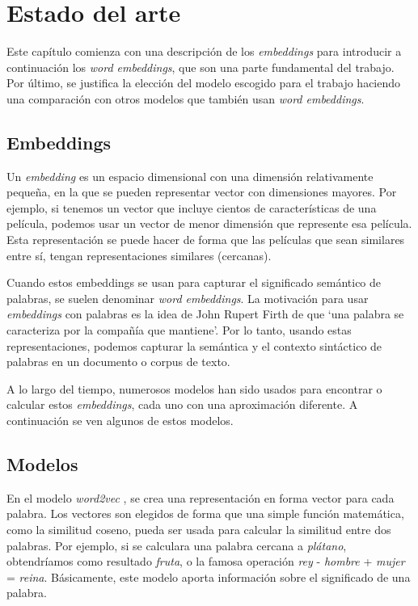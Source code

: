 \chapter{Estado del arte}

Este capítulo comienza con una descripción de los \textit{embeddings} para introducir a
continuación los \textit{word embeddings}, que son una parte fundamental del trabajo. Por
último, se justifica la elección del modelo escogido para el trabajo haciendo una comparación con
otros modelos que también usan \textit{word embeddings}.

\section{Embeddings}

Un \textit{embedding} es un espacio dimensional con una dimensión relativamente pequeña, en la que se pueden
representar vector con dimensiones mayores. Por ejemplo, si tenemos un vector que incluye cientos de características
de una película, podemos usar un vector de menor dimensión que represente esa película.  Esta representación se puede
hacer de forma que las películas que sean similares entre sí, tengan representaciones similares (cercanas).

Cuando estos embeddings se usan para capturar el significado semántico de palabras, se suelen denominar
\textit{word embeddings}. La motivación para usar \textit{embeddings} con palabras es la idea de John Rupert
Firth de que `una palabra se caracteriza por la compañía que mantiene'. Por lo tanto, usando estas representaciones,
podemos capturar la semántica y el contexto sintáctico de palabras en un documento o corpus de texto.

A lo largo del tiempo, numerosos modelos han sido usados para encontrar o calcular estos \textit{embeddings}, cada uno
con una aproximación diferente. A continuación se ven algunos de estos modelos.

\section{Modelos}

En el modelo \emph{word2vec} \cite{word2vec:1} \cite{word2vec:2}, se crea una representación
en forma vector para cada palabra. Los vectores son elegidos de forma que una simple función
matemática, como la similitud coseno, pueda ser usada para calcular la similitud entre dos palabras.
Por ejemplo, si se calculara una palabra cercana a \emph{plátano}, obtendríamos como resultado
\emph{fruta}, o la famosa operación \emph{rey} - \emph{hombre} + \emph{mujer} = \emph{reina}.
Básicamente, este modelo aporta información sobre el significado de una palabra.

